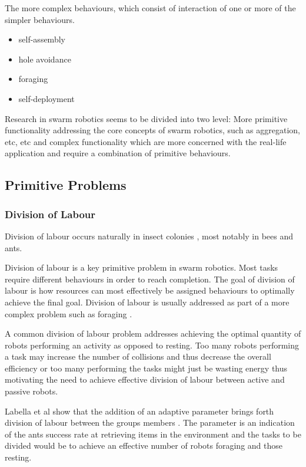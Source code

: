 The more complex behaviours, which consist of interaction of one or more of the simpler behaviours. 

\begin{itemize}
	\item self-assembly
	\item hole avoidance
	\item foraging
	\item self-deployment
\end{itemize}

Research in swarm robotics seems to be divided into two level: More primitive functionality addressing the core concepts of swarm robotics, such as aggregation, etc, etc and complex functionality which are more concerned with the real-life application and require a combination of primitive behaviours.

\subsection{Primitive Problems}

\subsubsection{Division of Labour}
Division of labour occurs naturally in insect colonies \cite{gautrais2002emergent}, most notably in bees and ants.

Division of labour is a key primitive problem  in swarm robotics. Most tasks require different behaviours in order to reach completion. The goal of division of labour is how resources can most effectively be assigned behaviours to optimally achieve the final goal. Division of labour is usually addressed as part of a more complex problem such as foraging \cite{jones2003adaptive}.
 
A common division of labour problem addresses achieving the optimal quantity of robots performing an activity as opposed to resting. Too many robots performing a task may increase the number of collisions and thus decrease the overall efficiency or too many performing the tasks might just be wasting energy thus motivating the need to achieve effective division of labour between active and passive robots.

Labella et al show  that the addition of an adaptive parameter brings forth division of labour between the groups members \cite{labella2006division}. The parameter is an indication of the ants success rate at retrieving items in the environment and the tasks to be divided would be to achieve an effective number of robots foraging and those resting.


